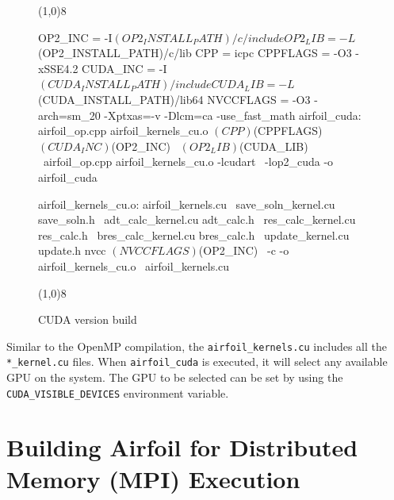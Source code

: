 \documentclass[11pt]{article}
\begin{document}
\begin{figure}[!h]\small
\vspace{-0pt}\noindent\line(1,0){8}\vspace{-20pt}
\begin{pyglist}[language=make]
OP2_INC         = -I$(OP2_INSTALL_PATH)/c/include
OP2_LIB         = -L$(OP2_INSTALL_PATH)/c/lib
CPP             = icpc
CPPFLAGS         = -O3 -xSSE4.2 
CUDA_INC        = -I$(CUDA_INSTALL_PATH)/include
CUDA_LIB        = -L$(CUDA_INSTALL_PATH)/lib64
NVCCFLAGS       = -O3 -arch=sm_20 -Xptxas=-v -Dlcm=ca -use_fast_math 
airfoil_cuda:	airfoil_op.cpp airfoil_kernels_cu.o
                $(CPP) $(CPPFLAGS) $(CUDA_INC) $(OP2_INC) \
                $(OP2_LIB) $(CUDA_LIB) \
                airfoil_op.cpp airfoil_kernels_cu.o -lcudart \
               -lop2_cuda -o airfoil_cuda                                      

airfoil_kernels_cu.o:	airfoil_kernels.cu      \
                save_soln_kernel.cu save_soln.h \
                adt_calc_kernel.cu  adt_calc.h  \
                res_calc_kernel.cu  res_calc.h  \
                bres_calc_kernel.cu bres_calc.h \
                update_kernel.cu    update.h    
                nvcc $(NVCCFLAGS) $(OP2_INC) \
                -c -o airfoil_kernels_cu.o \
                airfoil_kernels.cu
\end{pyglist}
\vspace{-10pt}\noindent\line(1,0){8}\vspace{-10pt}
\caption{\small CUDA version build }
\normalsize\vspace{-10pt}\label{fig:cudabuild}
\end{figure}

\noindent Similar to the OpenMP compilation, the \texttt{airfoil\_kernels.cu} includes all the \texttt{*\_kernel.cu}
files. When \texttt{airfoil\_cuda} is executed, it will select any available GPU  on the system. The GPU to be selected
can be set by using the \texttt{CUDA\_VISIBLE\_DEVICES} environment variable. 

\newpage
\section{Building Airfoil for Distributed Memory (MPI) Execution}\label{sec/mpi}
\end{document}
